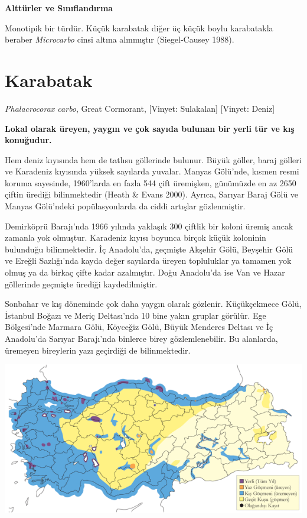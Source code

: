 \documentclass[
  letterpaper,
  DIV=11,
  numbers=noendperiod]{scrreprt}
\begin{document}
\textbf{Alttürler ve Sınıflandırma}

Monotipik bir türdür. Küçük karabatak diğer üç küçük boylu karabatakla
beraber \emph{Microcarbo} cinsi altına alınmıştır (Siegel-Causey 1988).

\section{Karabatak}\label{karabatak}

\emph{Phalacrocorax carbo}, Great Cormorant, {[}Vinyet: Sulakalan{]}
{[}Vinyet: Deniz{]}

\textbf{Lokal olarak üreyen, yaygın ve çok sayıda bulunan bir yerli tür
ve kış konuğudur.}

Hem deniz kıyısında hem de tatlısu göllerinde bulunur. Büyük göller,
baraj gölleri ve Karadeniz kıyısında yüksek sayılarda yuvalar. Manyas
Gölü'nde, kısmen resmi koruma sayesinde, 1960'larda en fazla 544 çift
üremişken, günümüzde en az 2650 çiftin ürediği bilinmektedir (Heath \&
Evans 2000). Ayrıca, Sarıyar Baraj Gölü ve Manyas Gölü'ndeki
popülasyonlarda da ciddi artışlar gözlenmiştir.

Demirköprü Barajı'nda 1966 yılında yaklaşık 300 çiftlik bir koloni
üremiş ancak zamanla yok olmuştur. Karadeniz kıyısı boyunca birçok küçük
koloninin bulunduğu bilinmektedir. İç Anadolu'da, geçmişte Akşehir Gölü,
Beyşehir Gölü ve Ereğli Sazlığı'nda kayda değer sayılarda üreyen
topluluklar ya tamamen yok olmuş ya da birkaç çifte kadar azalmıştır.
Doğu Anadolu'da ise Van ve Hazar göllerinde geçmişte ürediği
kaydedilmiştir.

Sonbahar ve kış döneminde çok daha yaygın olarak gözlenir. Küçükçekmece
Gölü, İstanbul Boğazı ve Meriç Deltası'nda 10 bine yakın gruplar
görülür. Ege Bölgesi'nde Marmara Gölü, Köyceğiz Gölü, Büyük Menderes
Deltası ve İç Anadolu'da Sarıyar Barajı'nda binlerce birey
gözlemlenebilir. Bu alanlarda, üremeyen bireylerin yazı geçirdiği de
bilinmektedir.

\includegraphics{images/harita_Page_079.png}
\end{document}
